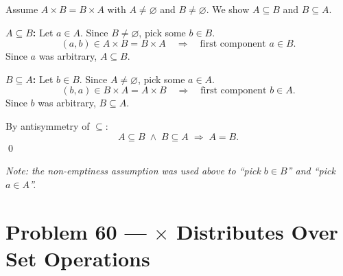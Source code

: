 \documentclass[12pt, a4paper]{article}
\begin{document}
\medskip
Assume $A \times B = B \times A$ with $A \neq \varnothing$ and $B \neq \varnothing$.
We show $A \subseteq B$ and $B \subseteq A$.

\textbf{$A \subseteq B$:}\;
Let $a \in A$. Since $B \neq \varnothing$, pick some $b \in B$.
\[
  (a, b) \in A \times B = B \times A
  \quad\Longrightarrow\quad
  \text{first component } a \in B.
\]
Since $a$ was arbitrary, $A \subseteq B$.

\textbf{$B \subseteq A$:}\;
Let $b \in B$. Since $A \neq \varnothing$, pick some $a \in A$.
\[
  (b, a) \in B \times A = A \times B
  \quad\Longrightarrow\quad
  \text{first component } b \in A.
\]
Since $b$ was arbitrary, $B \subseteq A$.

By antisymmetry of $\subseteq$:
\[
  \boxed{A \subseteq B \;\land\; B \subseteq A \;\Longrightarrow\; A = B.}
\]
\qed

\textit{Note: the non-emptiness assumption was used above to ``pick $b \in B$'' and ``pick $a \in A$''.}

\newpage
\section{Problem 60 --- $\times$ Distributes Over Set Operations}
\end{document}
